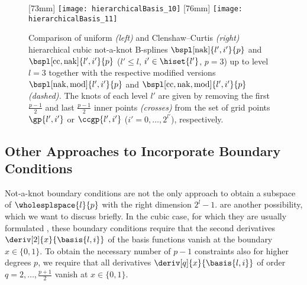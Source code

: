 \begin{figure}
  [73mm]{%
    \texttt{[image: hierarchicalBasis\_10]}%
  }%
  \hfill
  [76mm]{%
    \texttt{[image: hierarchicalBasis\_11]}%
  }%
  \caption[%
    Comparison of hierarchical not-a-knot B-splines%
  ]{%
    Comparison of uniform \emph{(left)} and
    Clenshaw--Curtis \emph{(right)} hierarchical cubic not-a-knot
    B-splines $\bspl[\nak]{l',i'}{p}$ and
    $\bspl[\cc,\nak]{l',i'}{p}$
    ($l ' \le l$, $i' \in \hiset{l'}$, $p = 3$) up to level $l = 3$
    together with the respective modified versions
    $\bspl[\nak,\modified]{l',i'}{p}$ and
    $\bspl[\cc,\nak,\modified]{l',i'}{p}$
    \emph{(dashed).}
    The knots of each level $l'$ are given by removing the
    first $\tfrac{p-1}{2}$ and last $\tfrac{p-1}{2}$
    inner points \emph{(crosses)}
    from the set of grid points $\gp{l',i'}$ or
    $\ccgp{l',i'}$
    ($i' = 0, \dotsc, 2^{l'}$), respectively.%
  }%
  \label{fig:uniformAndClenshawCurtisNotAKnotBSpline}%
\end{figure}



\subsection{Other Approaches to Incorporate Boundary Conditions}
\label{sec:324naturalBoundary}

Not-a-knot boundary conditions are not the only approach
to obtain a subspace of $\wholesplspace{l}{p}$ with the right dimension $2^l - 1$.
 are another possibility,
which we want to discuss briefly.
In the cubic case, for which they are usually formulated
\cite{Hoellig13Approximation},
these boundary conditions require that the
second derivatives $\deriv[2]{x}{\basis{l,i}}$ of the
basis functions vanish at the boundary $x \in \{0, 1\}$.
To obtain the necessary number of $p - 1$ constraints also
for higher degrees $p$,
we require that all derivatives
$\deriv[q]{x}{\basis{l,i}}$ of order
$q = 2, \dotsc, \tfrac{p+1}{2}$ vanish at $x \in \{0, 1\}$.

